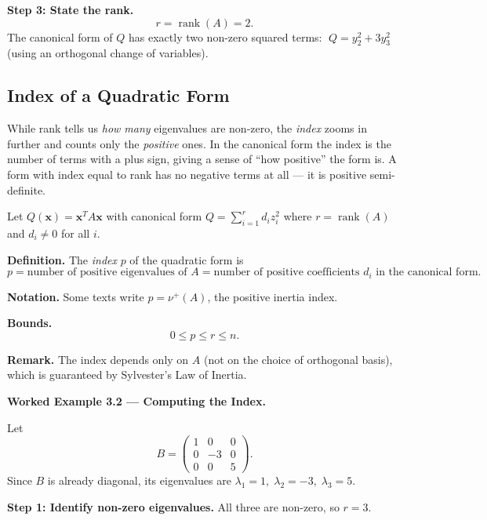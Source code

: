 \documentclass[12pt,a4paper]{article}
\begin{document}
\textbf{Step 3: State the rank.}
\[
  r = \operatorname{rank}(A) = 2.
\]
The canonical form of \(Q\) has exactly two non-zero squared terms:
\(\;Q = y_2^2 + 3y_3^2\;\) (using an orthogonal change of variables).

\subsection{Index of a Quadratic Form}

While rank tells us \emph{how many} eigenvalues are non-zero, the \emph{index} zooms in
further and counts only the \emph{positive} ones. In the canonical form the index is the
number of terms with a plus sign, giving a sense of ``how positive'' the form is. A form
with index equal to rank has no negative terms at all --- it is positive semi-definite.

\begin{infobox}
Let \(Q(\mathbf{x}) = \mathbf{x}^{T} A \mathbf{x}\) with canonical form
\(\displaystyle Q = \sum_{i=1}^{r} d_i z_i^2\) where \(r = \operatorname{rank}(A)\)
and \(d_i \neq 0\) for all \(i\).

\medskip
\textbf{Definition.} The \emph{index} \(p\) of the quadratic form is
\[
  p = \text{number of positive eigenvalues of } A
    = \text{number of positive coefficients } d_i \text{ in the canonical form.}
\]

\medskip
\textbf{Notation.} Some texts write \(p = \nu^+(A)\), the positive inertia index.

\medskip
\textbf{Bounds.}
\[
  0 \leq p \leq r \leq n.
\]

\medskip
\textbf{Remark.} The index depends only on \(A\) (not on the choice of orthogonal basis),
which is guaranteed by Sylvester's Law of Inertia.
\end{infobox}

\medskip
\noindent\textbf{Worked Example 3.2 --- Computing the Index.}

Let
\[
B = \begin{pmatrix} 1 & 0 & 0 \\ 0 & -3 & 0 \\ 0 & 0 & 5 \end{pmatrix}.
\]
Since \(B\) is already diagonal, its eigenvalues are \(\lambda_1 = 1,\; \lambda_2 = -3,\;
\lambda_3 = 5\).

\textbf{Step 1: Identify non-zero eigenvalues.} All three are non-zero, so \(r = 3\).
\end{document}

